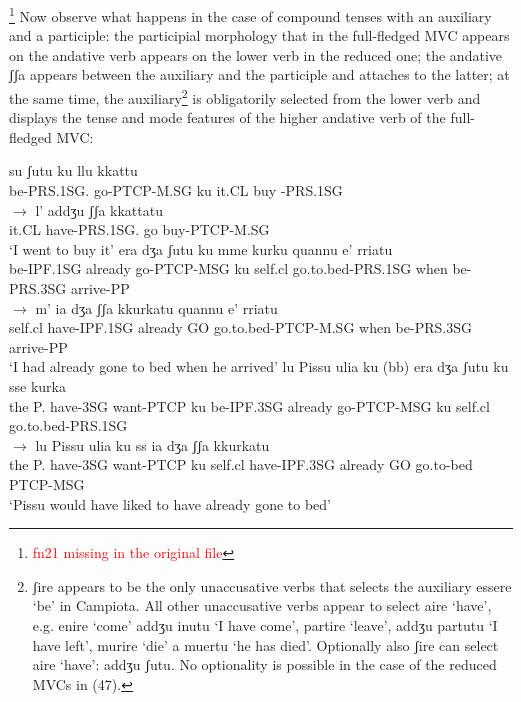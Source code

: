 \documentclass[output=paper,colorlinks,citecolor=brown,
]{langscibook}
\begin{document}
\footnote{\textcolor{red}{fn21 missing in the original file}}
Now observe what happens in the case of compound tenses with an auxiliary and a participle: the participial morphology that in the full-fledged MVC appears on the andative verb appears on the lower verb in the reduced one; the andative ʃʃa  appears between the auxiliary and the participle and attaches to the latter; at the same time, the auxiliary\footnote{ʃire appears to be the only unaccusative verbs that selects the auxiliary essere ‘be’ in Campiota.  All other unaccusative verbs appear to select aire ‘have’, e.g. enire ‘come’ addʒu inutu ‘I have come’, partire ‘leave’, addʒu partutu ‘I have left’, murire ‘die’ a muertu ‘he has died’. Optionally also ʃire can select aire ‘have’: addʒu ʃutu.  No optionality is possible in the case of the reduced MVCs in (47).}  is obligatorily selected from the lower verb and displays the tense and mode features of the higher andative verb of the full-fledged MVC:

\ea
    \ea
        \ea \gll su        ʃutu        ku  llu   kkattu\\
       be-PRS.1SG.    go-PTCP-M.SG  ku   it.CL buy -PRS.1SG\\ 
        \ex $\rightarrow$ \gll l’   addʒu       ʃʃa   kkattatu\\
       it.CL have-PRS.1SG.    go  buy-PTCP-M.SG\\
      \glt ‘I went to buy it’
        \z
    \ex
        \ea \gll era      dʒa    ʃutu      ku mme   kurku     quannu  e’       rriatu \\
       be-IPF.1SG already go-PTCP-MSG ku self.cl go.to.bed-PRS.1SG
       when    be-PRS.3SG  arrive-PP\\
        \ex    $\rightarrow$  \gll m’   ia        dʒa   ʃʃa  kkurkatu        quannu  e’        rriatu\\
       self.cl  have-IPF.1SG already GO  go.to.bed-PTCP-M.SG  
       when    be-PRS.3SG  arrive-PP\\
       \glt ‘I had already gone to bed when he arrived’
        \z
    \ex
        \ea \gll lu Pissu ulia   ku    (bb) era    dʒa   ʃutu         ku sse    kurka\\
       the P.  have-3SG want-PTCP ku be-IPF.3SG already go-PTCP-MSG    ku self.cl   go.to.bed-PRS.1SG\\
        \ex    $\rightarrow$ \gll lu Pissu ulia   ku       ss   ia      dʒa         ʃʃa  kkurkatu\\
      the P.  have-3SG want-PTCP ku self.cl  have-IPF.3SG already 
       GO go.to-bed PTCP-MSG\\
      \glt ‘Pissu would have liked to have already gone to bed’
        \z
    \z
\z
\end{document}
